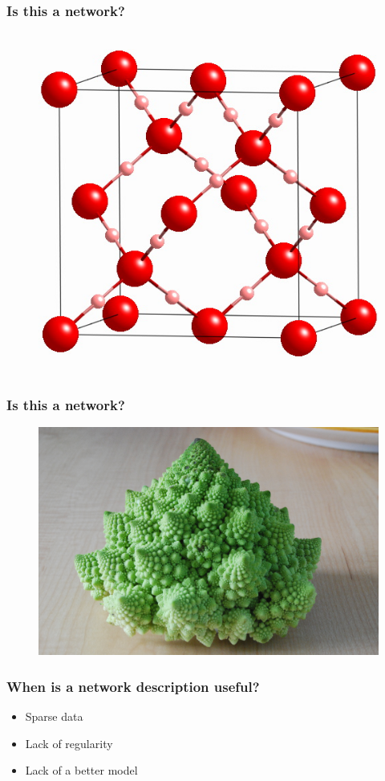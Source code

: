 \documentclass{beamer}
\begin{document}
\begin{frame}
    \frametitle{Is this a network?}
\begin{figure}
    \begin{center}
        \includegraphics[width=0.4\columnwidth]{crystal.jpeg}
    \end{center}
\end{figure}
\end{frame}
\begin{frame}
    \frametitle{Is this a network?}
\begin{figure}
    \begin{center}
        \includegraphics[width=0.7\columnwidth]{cauliflower.jpeg}
    \end{center}
\end{figure}
\end{frame}
\begin{frame}
    \frametitle{When is a network description useful?}
    \begin{itemize}
    \setlength\itemsep{1em}
        \item{Sparse data}
        \item{Lack of regularity}
        \item{Lack of a better model}
    \end{itemize}
\end{frame}
\end{document}
